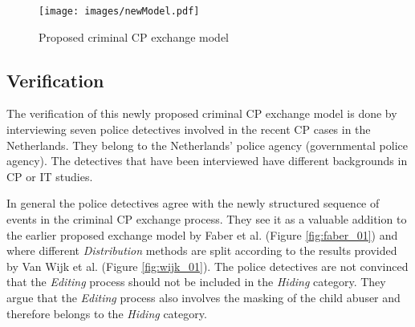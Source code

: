 \documentclass{sig-alternate-br}
\begin{document}
\begin{figure*}[ht]
\centering
\texttt{[image: images/newModel.pdf]}
\caption{Proposed criminal CP exchange model}
\label{fig:newModel}
\end{figure*}

\subsection{Verification}
The verification of this newly proposed criminal CP exchange model is done by interviewing seven police detectives involved in the recent CP cases in the Netherlands. They belong to the Netherlands' police agency (governmental police agency). The detectives that have been interviewed have different backgrounds in CP or IT studies.

In general the police detectives agree with the newly structured sequence of events in the criminal CP exchange process. They see it as a valuable addition to the earlier proposed exchange model by Faber et al. (Figure \ref{fig:faber_01}) and where different \textit{Distribution} methods are split according to the results provided by Van Wijk et al. (Figure \ref{fig:wijk_01}). The police detectives are not convinced that the \textit{Editing} process should not be included in the \textit{Hiding} category. They argue that the \textit{Editing} process also involves the masking of the child abuser and therefore belongs to the \textit{Hiding} category.
\end{document}
